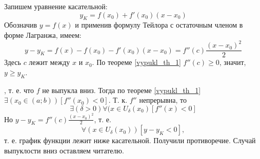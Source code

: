 \dokvo

\neobh
Запишем уравнение касательной:
$$
y_K=f(x_0)+f'(x_0)(x-x_0)
$$
Обозначив $y=f(x)$ и применив формулу Тейлора с остаточным членом в форме Лагранжа, имеем:
$$
y-y_K=f(x)-f(x_0)-f'(x_0)(x-x_0)=f''(c)\frac{(x-x_0)^2}{2}
$$
Здесь $c$ лежит между $x$ и $x_0$.
По теореме \ref{vypukl_th_1} $f''(c)\geq 0$, значит, $y\geq y_K$.

\dost
\pp, т. е. что $f$ не выпукла вниз.
Тогда по теореме \ref{vypukl_th_1} $\exists(x_0\in(a;b))[f''(x_0)<0]$.
Т. к. $f''$ непрерывна, то $$\exists(\delta>0)\forall(x\in U_\delta(x_0)[f''(x)<0]$$
Но $y-y_K=f''(c)\frac{(x-x_0)^2}{2}$, т. е. $$\forall(x\in U_\delta(x_0))[y-y_K<0],$$ т. е. график функции лежит ниже касательной.
Получили противоречие.
\dokno Случай выпуклости вниз оставляем читателю.


